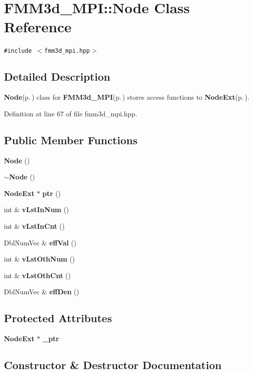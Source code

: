 \section{FMM3d\_\-MPI::Node Class Reference}
\label{classFMM3d__MPI_1_1Node}
{\tt \#include $<$fmm3d\_\-mpi.hpp$>$}



\subsection{Detailed Description}
{\bf Node}{\rm (p.\,\pageref{classFMM3d__MPI_1_1Node})} class for {\bf FMM3d\_\-MPI}{\rm (p.\,\pageref{classFMM3d__MPI})} stores access functions to {\bf Node\-Ext}{\rm (p.\,\pageref{classFMM3d__MPI_1_1NodeExt})}. 



Definition at line 67 of file fmm3d\_\-mpi.hpp.\subsection*{Public Member Functions}
\begin{CompactItemize}
\item 
{\bf Node} ()
\item 
{\bf $\sim$Node} ()
\item 
{\bf Node\-Ext} $\ast$ {\bf ptr} ()
\item 
int \& {\bf v\-Lst\-In\-Num} ()
\item 
int \& {\bf v\-Lst\-In\-Cnt} ()
\item 
Dbl\-Num\-Vec \& {\bf eff\-Val} ()
\item 
int \& {\bf v\-Lst\-Oth\-Num} ()
\item 
int \& {\bf v\-Lst\-Oth\-Cnt} ()
\item 
Dbl\-Num\-Vec \& {\bf eff\-Den} ()
\end{CompactItemize}
\subsection*{Protected Attributes}
\begin{CompactItemize}
\item 
{\bf Node\-Ext} $\ast$ {\bf \_\-ptr}
\end{CompactItemize}


\subsection{Constructor \& Destructor Documentation}
